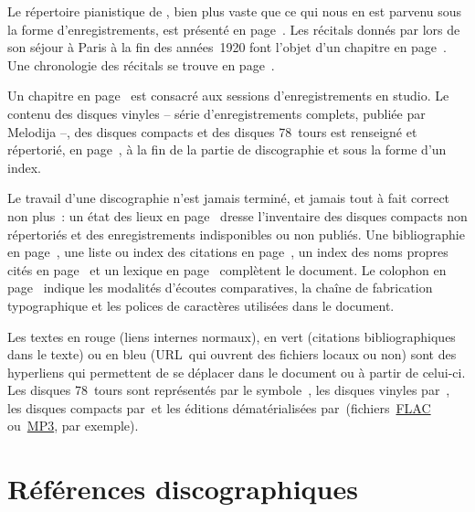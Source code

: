 Le répertoire pianistique de \VSofronitsky{}, bien plus vaste que ce qui
nous en est parvenu sous la forme d'enregistrements, est présenté en
page~\pageref{chap:Repertoire}.
Les récitals donnés par \VSofronitsky{} lors de son séjour à Paris à la fin
des années~1920 font l'objet d'un chapitre en page~\pageref{chap:Paris}.
Une chronologie des récitals se trouve en page~\pageref{chap:Recitals}.

Un chapitre en page~\pageref{chap:Studio} est consacré aux sessions
d'enregistrements en studio.
Le contenu des disques vinyles -- série d'enregistrements complets, publiée
par Melodija --, des disques compacts et des disques 78~tours est renseigné
et répertorié, en page~\pageref{chap:Contenu}, à la fin de la partie de
discographie et sous la forme d'un index.

Le travail d'une discographie n'est jamais terminé, et jamais tout à fait
correct non plus~: un état des lieux en page~\pageref{chap:Etat-des-lieux}
dresse l'inventaire des disques compacts non répertoriés et des
enregistrements indisponibles ou non publiés.
Une bibliographie en page~\pageref{chap:Bibliographie}, une liste ou index
des citations en page~\pageref{chap:Listedescitations}, un index des noms
propres cités en page~\pageref{chap:Indexonomastique} et un lexique en
page~\pageref{chap:Lexique} complètent le document.
Le colophon en page~\pageref{chap:Colophon} indique les modalités d'écoutes
comparatives, la chaîne de fabrication typographique et les polices de
caractères utilisées dans le document.

Les textes en \textcolor{dvsred}{rouge} (liens internes normaux), en
\textcolor{dvsgreen}{vert} (citations bibliographiques dans le texte) ou en
\textcolor{dvsblue}{bleu} (URL~qui ouvrent des fichiers locaux ou non) sont
des hyper\-liens qui permettent de se déplacer dans le document ou à partir
de celui-ci.
Les disques 78~tours sont représentés par le symbole~\symbSE, les disques
vinyles par~\symbLP, les disques compacts par~\symbCD et les éditions
dématérialisées par~\symbDO (fichiers~\href{https://xiph.org/flac/}{FLAC}
ou~\href{http://mpeg.chiariglione.org/standards/mpeg-2/audio}{MP3}, par
exemple).

\section{Références discographiques}

